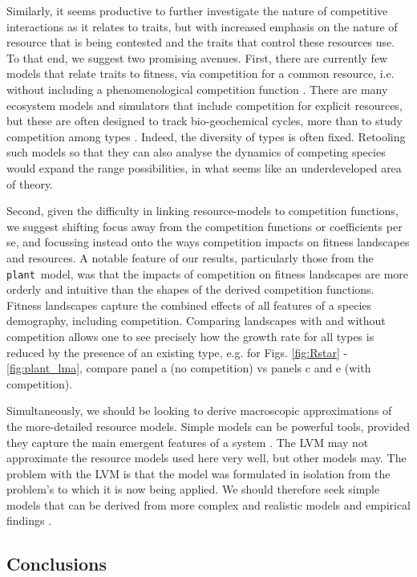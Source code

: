 \documentclass[a4paper,11pt]{article}
\newcommand{\plant}{{\tt plant}}
\begin{document}
Similarly, it seems productive to further investigate the nature of
competitive interactions as it relates to traits, but with increased
emphasis on the nature of resource that is being contested and the
traits that control these resources use. To that end, we suggest two
promising avenues. First, there are currently few models that relate
traits to fitness, via competition for a common resource, i.e. without
including a phenomenological competition function
\citep{DAndrea-2016a}. There are many ecosystem models and simulators
that include competition for explicit resources, but these are often
designed to track bio-geochemical cycles, more than to study
competition among types \citep{Fisher-2018}. Indeed, the diversity of types is often fixed. Retooling such models so that they can also analyse the dynamics of competing species would expand the range possibilities, in what seems like an underdeveloped area of theory. 

Second, given the difficulty in linking resource-models to competition functions, we suggest shifting focus away from the competition functions or coefficients per se, and focussing instead onto the ways competition impacts on fitness landscapes and resources. A notable feature of our results, particularly those from the \plant\ model, was that the impacts of competition on fitness landscapes are more orderly and intuitive than the shapes of the derived competition functions. Fitness landscapes capture the combined effects of all features of a species demography, including competition. Comparing landscapes with and without competition allows one to see precisely how the growth rate for all types is reduced by the presence of an existing type, e.g. for Figs. \ref{fig:Rstar} - \ref{fig:plant_lma}, compare panel a (no competition) vs panels c and e (with competition). 

Simultaneously, we should be looking to derive macroscopic approximations of the more-detailed resource models. Simple models can be powerful tools, provided they capture the main emergent features of a system \citep{Levin-2006}. The LVM may not approximate the resource models used here very well, but other models may. The problem with the LVM is that the model was formulated in isolation from the problem's to which it is now being applied. We should therefore seek simple models that can be derived from more complex and realistic models and empirical findings \citep[e.g.][]{Champagnat-2006}.

\subsection{Conclusions}
\end{document}
